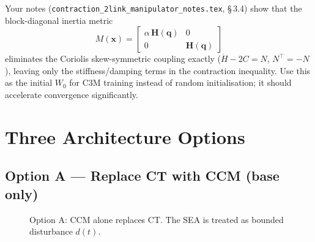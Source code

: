 \documentclass[11pt,a4paper]{article}
\newcommand{\bq}{\bm{q}}
\newcommand{\bu}{\bm{u}}
\newcommand{\btau}{\bm{\tau}}
\newcommand{\bH}{\bm{H}}
\newcommand{\bx}{\bm{x}}
\begin{document}
\begin{contractionbox}
Your notes (\texttt{contraction\_2link\_manipulator\_notes.tex}, \S\,3.4) show that
the block-diagonal inertia metric
\[
  M(\bx) = \begin{bmatrix}\alpha\,\bH(\bq) & 0 \\ 0 & \bH(\bq)\end{bmatrix}
\]
eliminates the Coriolis skew-symmetric coupling exactly ($\dot H - 2C = N$, $N^\top = -N$),
leaving only the stiffness/damping terms in the contraction inequality.
Use this as the initial $W_0$ for C3M training instead of random initialisation;
it should accelerate convergence significantly.
\end{contractionbox}

\section{Three Architecture Options}
\label{sec:options}

\subsection{Option A --- Replace CT with CCM (base only)}
\label{sec:optA}

\begin{figure}[ht]
\centering
{}
\caption{Option A: CCM alone replaces CT. The SEA is treated as bounded disturbance $d(t)$.}
\label{fig:optA}
\end{figure}
\end{document}

